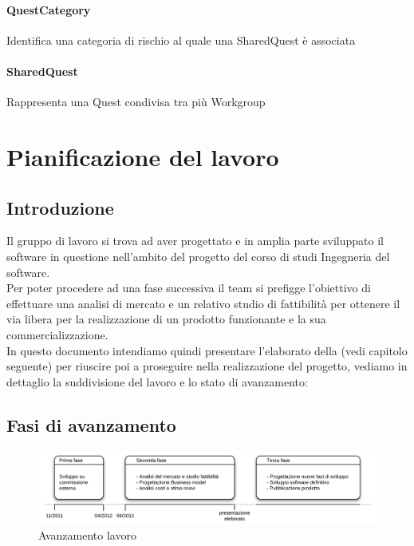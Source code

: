 \subsubsection{QuestCategory}Identifica una categoria di rischio al quale una SharedQuest è associata
\subsubsection{SharedQuest}Rappresenta una Quest condivisa tra più Workgroup








\chapter{Pianificazione del lavoro}
\label{pianificazioneDelLavoro}

\section{Introduzione}
Il gruppo di lavoro si trova ad aver progettato e in amplia parte sviluppato il software in questione nell'ambito del progetto del corso di studi Ingegneria del software. \\Per poter procedere ad una fase successiva il team si prefigge l'obiettivo di effettuare una analisi di mercato e un relativo studio di fattibilità per ottenere il via libera per la realizzazione di un prodotto funzionante e la sua commercializzazione.\\In questo documento intendiamo quindi presentare l'elaborato della  (vedi capitolo seguente) per riuscire poi a proseguire nella realizzazione del progetto, vediamo in dettaglio la suddivisione del lavoro e lo stato di avanzamento:

\section{Fasi di avanzamento}

\vspace*{0.5cm}

\begin{figure}[H]
\centering
\includegraphics[scale=0.7]{images/cap3/avanzamento.png}
\caption{Avanzamento lavoro}
\end{figure} 

